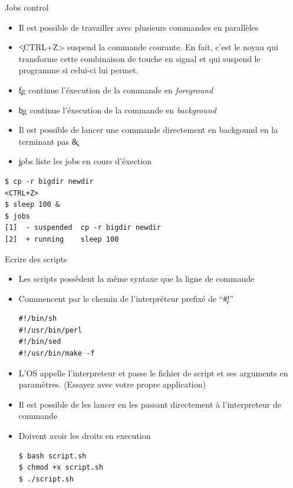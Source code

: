 \begin{frame}[fragile=singleslide]{Jobs control}
  \begin{itemize}
  \item  Il est  possible de  travailler avec  plusieurs  commandes en
    parallèles
  \item \c{<CTRL+Z>}  suspend la commande courante. En  fait, c'est le
    noyau qui transforme cette combinaison  de touche en signal et qui
    suspend le programme si celui-ci lui permet.
  \item    \c{fg}   continue   l'éxecution    de   la    commande   en
    \emph{foreground}
  \item    \c{bg}   continue   l'éxecution    de   la    commande   en
    \emph{background}
  \item  Il  est  possible  de  lancer  une  commande  directement  en
    backgound en la terminant pas \c{&}
  \item \c{jobs} liste les jobs en cours d'éxection
  \end{itemize}
  \begin{lstlisting}
$ cp -r bigdir newdir
<CTRL+Z>
$ sleep 100 &
$ jobs
[1]  - suspended  cp -r bigdir newdir
[2]  + running    sleep 100
  \end{lstlisting}
\end{frame}

\begin{frame}[fragile=singleslide]{Ecrire des scripts}
  \begin{itemize}
  \item Les scripts possèdent la même syntaxe que la ligne de commande
  \item  Commencent  par  le   chemin  de  l'interpréteur  prefixé  de
    ``\c{#!}''
    \begin{lstlisting}
#!/bin/sh
#!/usr/bin/perl
#!/bin/sed
#!/usr/bin/make -f
    \end{lstlisting}
  \item L'OS appelle l'interpreteur et  passe le fichier de script et
    ses   arguments   en  paramètres.   (Essayez   avec  votre   propre
    application)
  \item Il  est possible  de les lancer  en les passant  directement à
    l'interpreteur de commande
  \item Doivent avoir les droits en execution
    \begin{lstlisting}
$ bash script.sh
$ chmod +x script.sh
$ ./script.sh
    \end{lstlisting} %
  \end{itemize}
\end{frame}

